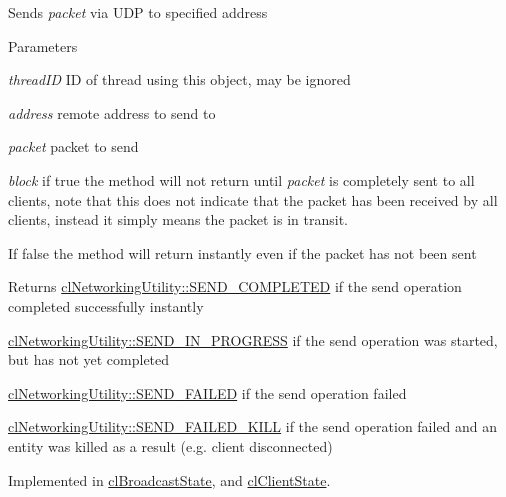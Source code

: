 \label{classcl_instance_u_d_p_a2a429c537132c699c920b3deb2b96a43}
Sends {\itshape packet\/} via UDP to specified address 
\begin{DoxyParams}{Parameters}
\item[{\em threadID}]ID of thread using this object, may be ignored \item[{\em address}]remote address to send to \item[{\em packet}]packet to send \item[{\em block}]if true the method will not return until {\itshape packet\/} is completely sent to all clients, note that this does not indicate that the packet has been received by all clients, instead it simply means the packet is in transit. \par
 If false the method will return instantly even if the packet has not been sent\end{DoxyParams}
\begin{DoxyReturn}{Returns}
\hyperlink{classcl_networking_utility_a19389cda12603396e03caa9d82073803abaa42412f2920363cef741fd5b2e202a}{clNetworkingUtility::SEND\_\-COMPLETED} if the send operation completed successfully instantly 

\hyperlink{classcl_networking_utility_a19389cda12603396e03caa9d82073803a807b2f9dcc901c6012549316bccfe407}{clNetworkingUtility::SEND\_\-IN\_\-PROGRESS} if the send operation was started, but has not yet completed 

\hyperlink{classcl_networking_utility_a19389cda12603396e03caa9d82073803a583b1181229130ff739548c8f8de363c}{clNetworkingUtility::SEND\_\-FAILED} if the send operation failed 

\hyperlink{classcl_networking_utility_a19389cda12603396e03caa9d82073803ab06ce588df19988e79b503398b720c79}{clNetworkingUtility::SEND\_\-FAILED\_\-KILL} if the send operation failed and an entity was killed as a result (e.g. client disconnected) 
\end{DoxyReturn}


Implemented in \hyperlink{classcl_broadcast_state_ad57cd2f1b520b292de409e5bf064d92b}{clBroadcastState}, and \hyperlink{classcl_client_state_aff27b2186960a4b8279e77ba8df634d0}{clClientState}.

